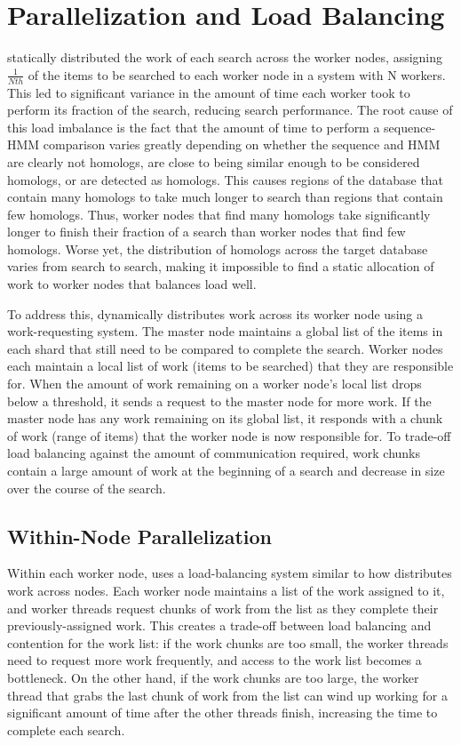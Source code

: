 \documentclass[notoc,justified,openany]{tufte-book}    %
\newcommand{\hmmserver}{\mono{hmmserver}\xspace}
\newcommand{\hmmpgmd}{\mono{hmmpgmd}\xspace}
\newcommand{\Hmmpgmd}{\mono{Hmmpgmd}\xspace}
\begin{document}
\section{Parallelization and Load Balancing}
\Hmmpgmd statically distributed the work of each search across the worker nodes, assigning $\frac{1}{Nth}$ of the items to be searched to each worker node in a system with N workers.  This led to significant variance in the amount of time each worker took to perform its fraction of the search, reducing search performance. The root cause of this load imbalance is the fact that the amount of time to perform a sequence-HMM comparison varies greatly depending on whether the sequence and HMM are clearly not homologs, are close to being similar enough to be considered homologs, or are detected as homologs.  This causes regions of the database that contain many homologs to take much longer to search than regions that contain few homologs.  Thus, worker nodes that find many homologs take significantly longer to finish their fraction of a search than worker nodes that find few homologs.  Worse yet, the distribution of homologs across the target database varies from search to search, making it impossible to find a static allocation of work to worker nodes that balances load well.

To address this, \hmmserver dynamically distributes work across its worker node using a work-requesting system.  The master node maintains a global list of the items in each shard that still need to be compared to complete the search.  Worker nodes each maintain a local list of work (items to be searched) that they are responsible for.  When the amount of work remaining on a worker node's local list drops below a threshold, it sends a request to the master node for more work.  If the master node has any work remaining on its global list, it responds with a chunk of work (range of items) that the worker node is now responsible for.  To trade-off load balancing against the amount of communication required, work chunks contain a large amount of work at the beginning of a search and decrease in size over the course of the search.

\subsection{Within-Node Parallelization}
Within each worker node, \hmmpgmd uses a load-balancing system similar to how \hmmserver distributes work across nodes.  Each worker node maintains a list of the work assigned to it, and worker threads request chunks of work from the list as they complete their previously-assigned work.  This creates a trade-off between load balancing and contention for the work list: if the work chunks are too small, the worker threads need to request more work frequently, and access to the work list becomes a bottleneck.  On the other hand, if the work chunks are too large, the worker thread that grabs the last chunk of work from the list can wind up working for a significant amount of time after the other threads finish, increasing the time to complete each search.
\end{document}
